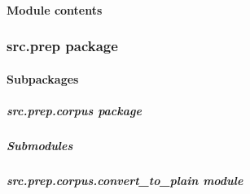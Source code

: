 \documentclass[letterpaper,10pt,english]{sphinxmanual}
\begin{document}

\begin{fulllineitems}
\label{src.mapping:src.mapping.mapthreading.init_argparse}
\end{fulllineitems}


\begin{fulllineitems}
\label{src.mapping:src.mapping.mapthreading.main}
\end{fulllineitems}



\paragraph{Module contents}
\label{src.mapping:module-src.mapping}\label{src.mapping:module-contents}

\subsubsection{src.prep package}
\label{src.prep::doc}\label{src.prep:src-prep-package}

\paragraph{Subpackages}
\label{src.prep:subpackages}

\subparagraph{src.prep.corpus package}
\label{src.prep.corpus::doc}\label{src.prep.corpus:src-prep-corpus-package}

\subparagraph{Submodules}
\label{src.prep.corpus:submodules}

\subparagraph{src.prep.corpus.convert\_to\_plain module}
\label{src.prep.corpus:src-prep-corpus-convert-to-plain-module}\label{src.prep.corpus:module-src.prep.corpus.convert_to_plain}

\begin{fulllineitems}
\label{src.prep.corpus:src.prep.corpus.convert_to_plain.alt}
\end{fulllineitems}
\end{document}
